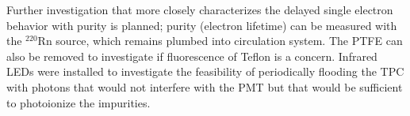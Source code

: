 
Further investigation that more closely characterizes the delayed single electron behavior with purity is planned; purity (electron lifetime) can be measured with the $^{220}$Rn source, which remains plumbed into circulation system. The \ac{PTFE} can also be removed to investigate if fluorescence of Teflon is a concern. Infrared LEDs were installed to investigate the feasibility of periodically flooding the \ac{TPC} with photons that would not interfere with the \ac{PMT} but that would be sufficient to photoionize the impurities. 



